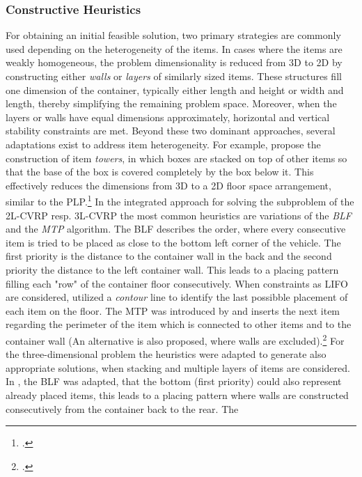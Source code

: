 \subsubsection{Constructive Heuristics}
For obtaining an initial feasible solution, two primary strategies are commonly
used depending on the heterogeneity of the items. In cases where the items are weakly homogeneous,
the problem dimensionality is reduced from 3D to 2D by constructing either
\textit{walls} or \textit{layers} of similarly sized items. These structures fill one
dimension of the container, typically either length and height or width and length, thereby
simplifying the remaining problem space. Moreover, when the layers or walls have
equal dimensions approximately, horizontal and vertical stability constraints are met.
Beyond these two dominant approaches, several adaptations exist to address item heterogeneity.
For example, \textcite{gehring_genetic_1997} propose the construction of item
\textit{towers}, in which boxes are stacked on top of other items so that the base of the box is covered completely
by the box below it. This effectively reduces the dimensions from 3D to a 2D floor space arrangement,
similar to the \gls{PLP}.\footcite[cf.][pp. 402--406]{gehring_genetic_1997}
In the integrated approach for solving the subproblem of the \gls{2L-CVRP} resp. \gls{3L-CVRP}
the most common heuristics are variations of the \textit{\Gls{BLF}}
and the \textit{\Gls{MTP}} algorithm. The \gls{BLF} describes the order, where
every consecutive item is tried to be placed as close to the bottom left corner of the vehicle. The
first priority is the distance to the container wall in the back and the second priority the distance
to the left container wall. This leads to a placing pattern filling each "row" of the container floor
consecutively.
When constraints as \gls{LIFO} are considered, \cite{iori_exact_2007} utilized a \textit{contour} line
to identify the last possibble placement of each item on the floor. The \gls{MTP} was introduced by
\cite{zachariadis_guided_2009} and inserts the next item regarding the perimeter of the item which is connected
to other items and to the container wall (An alternative is also proposed, where walls are excluded).\footcite[cf.][p.732f]{zachariadis_guided_2009}
For the three-dimensional problem the heuristics were adapted to generate also appropriate solutions, when
stacking and multiple layers of items are considered. In \cite{gendreau_tabu_2006}, the \gls{BLF}
was adapted, that the bottom (first priority) could also represent already placed items, this leads
to a placing pattern where walls are constructed consecutively from the container back to the rear. The
